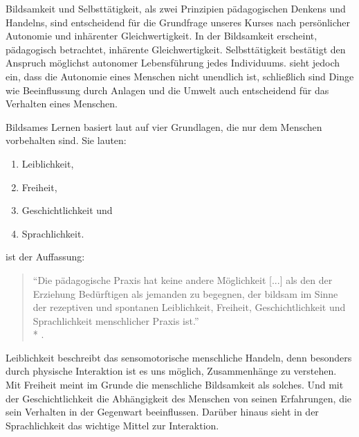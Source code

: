 Bildsamkeit und Selbsttätigkeit, als zwei Prinzipien pädagogischen Denkens und Handelns, sind entscheidend für die Grundfrage unseres Kurses nach persönlicher Autonomie und inhärenter Gleichwertigkeit.
In der Bildsamkeit erscheint, pädagogisch betrachtet, inhärente Gleichwertigkeit.
Selbsttätigkeit bestätigt den Anspruch möglichst autonomer Lebensführung jedes Individuums.
\citeauthor{benner-2012} sieht jedoch ein, dass die Autonomie eines Menschen nicht unendlich ist, schließlich sind Dinge wie Beeinflussung durch Anlagen und die Umwelt auch entscheidend für das Verhalten eines Menschen.

Bildsames Lernen basiert laut \citeauthor{benner-2012} auf vier Grundlagen, die nur dem Menschen vorbehalten sind.
Sie lauten:

\begin{enumerate}
	\item Leiblichkeit,
	\item Freiheit,
	\item Geschichtlichkeit und
	\item Sprachlichkeit.
\end{enumerate}

\citeauthor{benner-2012} ist der Auffassung:

\begin{quote}
	``Die pädagogische Praxis hat keine andere Möglichkeit [...] als den der Erziehung Bedürftigen als jemanden zu begegnen, der bildsam im Sinne der rezeptiven und spontanen Leiblichkeit, Freiheit, Geschichtlichkeit und Sprachlichkeit menschlicher Praxis ist.''\\*
	\textcite[vgl.][76]{benner-2012}.
\end{quote}

Leiblichkeit beschreibt das sensomotorische menschliche Handeln, denn besonders durch physische Interaktion ist es uns möglich, Zusammenhänge zu verstehen.
Mit Freiheit meint \citeauthor{benner-2012} im Grunde die menschliche Bildsamkeit als solches.
Und mit der Geschichtlichkeit die Abhängigkeit des Menschen von seinen Erfahrungen, die sein Verhalten in der Gegenwart beeinflussen.
Darüber hinaus sieht \citeauthor{benner-2012} in der Sprachlichkeit das wichtige Mittel zur Interaktion.

